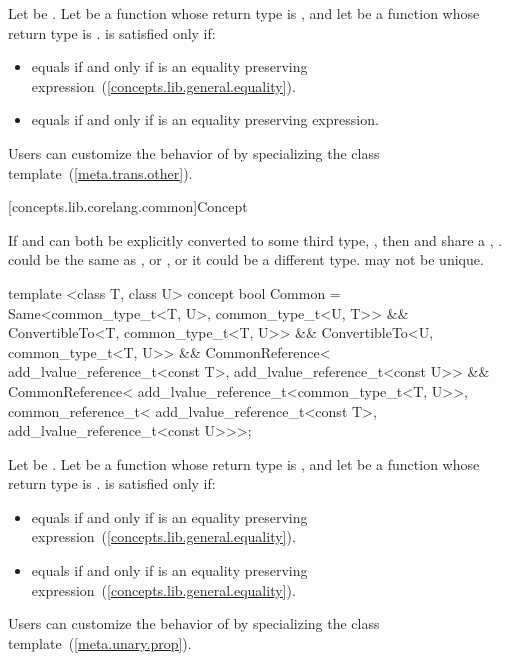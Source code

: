 \begin{itemdescr}
\pnum
Let  be . Let  be a
function whose return type is , and let  be a function
whose return type is .  is satisfied
only if:
\begin{itemize}
\item {} equals  if and only if  is an
  equality preserving expression~(\ref{concepts.lib.general.equality}).
\item {} equals  if and only if  is an
  equality preserving expression.
\end{itemize}

\pnum
\enternote Users can customize the behavior of  by specializing the
 class template~(\ref{meta.trans.other}).\exitnote
\end{itemdescr}

[concepts.lib.corelang.common]{Concept }

\pnum
If  and  can both be explicitly converted to some third type,
, then  and  share a ,
. \enternote {} could be the same as , or , or
it could be a different type.  may not be unique.\exitnote

%
\begin{itemdecl}
template <class T, class U>
concept bool Common =
  Same<common_type_t<T, U>, common_type_t<U, T>> &&
  ConvertibleTo<T, common_type_t<T, U>> &&
  ConvertibleTo<U, common_type_t<T, U>> &&
  CommonReference<
    add_lvalue_reference_t<const T>,
    add_lvalue_reference_t<const U>> &&
  CommonReference<
    add_lvalue_reference_t<common_type_t<T, U>>,
    common_reference_t<
      add_lvalue_reference_t<const T>,
      add_lvalue_reference_t<const U>>>;
\end{itemdecl}

\begin{itemdescr}
\pnum
Let  be . Let
 be a function whose return type is , and let  be a function
whose return type is .  is satisfied only if:
\begin{itemize}
\item {} equals  if and only if
   is an equality preserving
  expression~(\ref{concepts.lib.general.equality}).
\item {} equals  if and only if
   is an equality preserving
  expression~(\ref{concepts.lib.general.equality}).
\end{itemize}

\pnum
\enternote Users can customize the behavior of  by specializing the 
class template~(\ref{meta.unary.prop}).\exitnote

\end{itemdescr}

